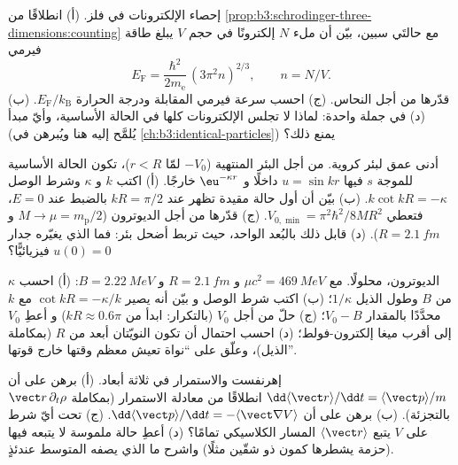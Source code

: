 \begin{exercise}[$\star\star$]\label{exo:b3:schrodinger-three-dimensions:8}
إحصاء الإلكترونات في فلز. (أ) انطلاقًا من
\cref{prop:b3:schrodinger-three-dimensions:counting} مع حالتَي
سبين، بيّن أن ملء $N$ إلكترونًا في حجم $V$ يبلغ
طاقة فيرمي
\[
E_{\text{F}} = \frac{\hbar^2}{2m_{\text{e}}}\,(3\pi^2n)^{2/3} ,
\qquad n = N/V .
\]
(ب) قدّرها من أجل النحاس. (ج) احسب سرعة فيرمي المقابلة
ودرجة الحرارة $E_{\text{F}}/k_{\text{B}}$. (د) في جملة واحدة:
لماذا لا تجلس الإلكترونات كلها في الحالة الأساسية، وأيّ
مبدأ (يُلمَّح إليه هنا ويُبرهن في
\cref{ch:b3:identical-particles}) يمنع ذلك؟
\end{exercise}

\begin{exercise}[$\star\star$]\label{exo:b3:schrodinger-three-dimensions:9}
أدنى عمق لبئر كروية. من أجل البئر المنتهية ($-V_0$ لمّا
$r < R$)، تكون الحالة الأساسية للموجة $s$ فيها $u = \sin kr$ داخلًا و
$\eu^{-\kappa r}$ خارجًا. (أ) اكتب $k$ و $\kappa$ وشرط
الوصل $k\cot kR = -\kappa$. (ب) بيّن أن أول حالة مقيدة
تظهر عند $kR = \pi/2$ بالضبط عند $E = 0$، فتعطي
$V_{0,\min} = \pi^2\hbar^2/8MR^2$. (ج) قدّرها من أجل الديوترون
($M \to \mu = m_{\text{p}}/2$ و $R = \qty{2.1}{fm}$). (د) قابل
ذلك بالبُعد الواحد، حيث تربط أضحل بئر: فما الذي يغيّره جدار
$u(0) = 0$ فيزيائيًّا؟
\end{exercise}

\begin{exercise}[$\star\star\star$]\label{exo:b3:schrodinger-three-dimensions:10}
الديوترون، محلولًا. مع $\mu c^2 = \qty{469}{MeV}$ و $R =
\qty{2.1}{fm}$ و $B = \qty{2.22}{MeV}$: (أ) احسب $\kappa$ من $B$
وطول الذيل $1/\kappa$؛ (ب) اكتب شرط الوصل و
بيّن أنه يصير $\cot kR = -\kappa/k$ مع $k$ محدَّدًا بالمقدار $V_0 - B$؛
(ج) حلّ من أجل $V_0$ (بالتكرار: ابدأ من $kR \approx 0.6\pi$) و
أعطِ $V_0$ إلى أقرب ميغا إلكترون-فولط؛ (د) احسب احتمال أن تكون
النويّتان أبعد من $R$ (بمكاملة الذيل)،
وعلّق على ``نواة تعيش معظم وقتها خارج قوتها''.
\end{exercise}

\begin{exercise}[$\star\star\star$]\label{exo:b3:schrodinger-three-dimensions:11}
إهرنفست والاستمرار في ثلاثة أبعاد. (أ) برهن على أن
$\dd\langle\vect r\rangle/\dd t = \langle\vect p\rangle/m$ انطلاقًا من
معادلة الاستمرار (بمكاملة $\vect r\,\partial_t\rho$ بالتجزئة).
(ب) برهن على أن $\dd\langle\vect p\rangle/\dd t =
-\langle\vect\nabla V\rangle$. (ج) تحت أيّ شرط على $V$ يتبع
$\langle\vect r\rangle$ المسار الكلاسيكي تمامًا؟ (د)
أعطِ حالة ملموسة لا يتبعه فيها (حزمة يشطرها كمون ذو
شقّين مثلًا) واشرح ما الذي يصفه المتوسط عندئذٍ.
\end{exercise}

